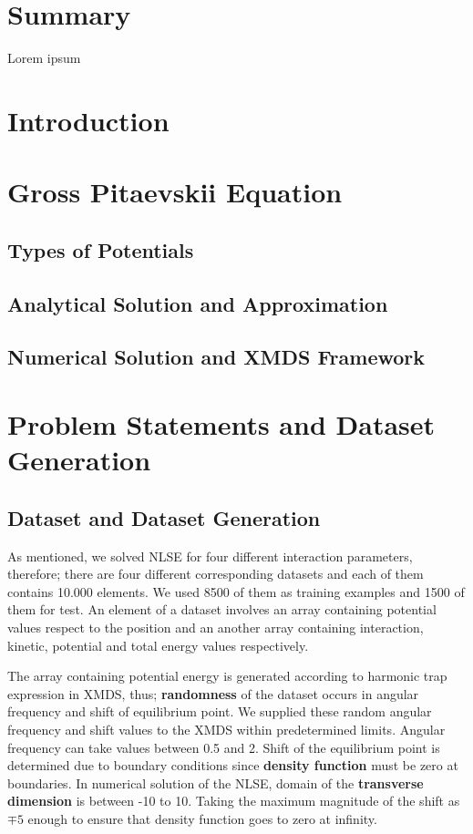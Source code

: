 \documentclass[a4paper,times,12pt]{article}
\title{}%
\date{}
\begin{document}
\setcounter{page}{1}

\section*{Summary}
Lorem ipsum
\section{Introduction}
\section{Gross Pitaevskii Equation}





\subsection{Types of Potentials}
\subsection{Analytical Solution and Approximation}
\subsection{Numerical Solution and XMDS Framework}
\section{Problem Statements and Dataset Generation}

\subsection{Dataset and Dataset Generation}

As mentioned, we solved NLSE for four different interaction parameters, therefore; there are four different corresponding datasets and each of them contains 10.000 elements. We used 8500 of them as training examples and 1500 of them for test. An element of a dataset involves an array containing potential values respect to the position and an another array containing interaction, kinetic, potential and total energy values respectively. 

The array containing potential energy is generated according to harmonic trap expression in XMDS, thus; \textbf{randomness} of the dataset occurs in angular frequency and shift of equilibrium point. We supplied these random angular frequency and shift values to the XMDS within predetermined limits. Angular frequency can take values between 0.5 and 2. Shift of the equilibrium point is determined due to boundary conditions since \textbf{density function} must be zero at boundaries. In numerical solution of the NLSE, domain of the \textbf{transverse dimension} is between -10 to 10. Taking the maximum magnitude of the shift as $\mp 5$ enough to ensure that density function goes to zero at infinity.
\end{document}
